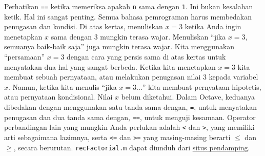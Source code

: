 \noindent Perhatikan \texttt{==} ketika memeriksa apakah \texttt{n}
sama dengan \texttt{1}. Ini bukan kesalahan ketik. Hal ini sangat
penting. Semua bahasa pemrograman harus membedakan penugasan dan kondisi.
Di atas kertas, menuliskan $x=3$ ketika Anda ingin menetapkan $x$
sama dengan 3 mungkin terasa wajar. Menuliskan ``jika $x=3$, semuanya
baik-baik saja'' juga mungkin terasa wajar. Kita menggunakan ``persamaan''
$x=3$ dengan cara yang persis sama di atas kertas untuk menyatakan
dua hal yang sangat berbeda. Ketika kita menetapkan $x=3$ kita membuat
sebuah pernyataan, atau melakukan penugasan nilai 3 kepada variabel
$x$. Namun, ketika kita menulis ``jika $x=3\ldots$'' kita membuat
pernyataan hipotetis, atau pernyataan kondisional. Nilai $x$ belum
diketahui. Dalam Octave, keduanya dibedakan dengan menggunakan satu
tanda sama dengan, \texttt{=}, untuk menyatakan penugasan dan dua
tanda sama dengan, \texttt{==}, untuk menguji kesamaan. Operator perbandingan
lain yang mungkin Anda perlukan adalah \texttt{<} dan \texttt{>},
yang memiliki arti sebagaimana lazimnya, serta \texttt{<=} dan \texttt{>=}
yang masing-masing berarti $\leq$ dan $\geq$, secara berurutan.
\texttt{recFactorial.m} dapat diunduh dari \href{http://lqbrin.github.io/tea-time-numerical/ancillaries.html}{situs pendamping}.

\noindent\startexercises

